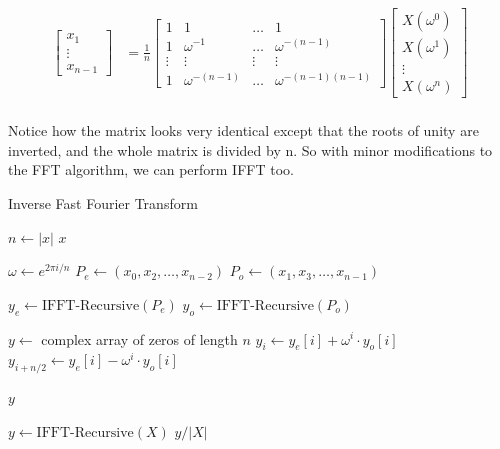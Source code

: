 \begin{align*}
\begin{bmatrix}
    x_1\\
    \vdots\\
    x_{n-1}
\end{bmatrix}
    &=
    \frac{1}{n}
\begin{bmatrix}
    1      & 1      & \dots  & 1\\
    1      & \omega^{-1} & \dots  & \omega^{-(n-1)}\\
    \vdots & \vdots & \vdots & \vdots\\
    1      & \omega^{-(n-1)} & \dots & \omega^{-(n-1)(n-1)}
\end{bmatrix}
\begin{bmatrix}
    X(\omega^0)\\
    X(\omega^1)\\
    \vdots\\
    X(\omega^n)
\end{bmatrix}\\
\end{align*}

Notice how the matrix looks very identical except that the roots of unity are inverted, and the whole matrix is divided by n. So with minor modifications to the FFT algorithm, we can perform IFFT too.

\begin{algorithm}
\caption{Inverse Fast Fourier Transform}
\begin{algorithmic}[1]
    \State $n \gets |x|$ 
        \State \Return $x$
    \EndIf
    
    \State $\omega \gets e^{2\pi i / n}$ 
    \State $P_e \gets (x_0, x_2, \ldots, x_{n-2})$ 
    \State $P_o \gets (x_1, x_3, \ldots, x_{n-1})$ 
    
    \State $y_e \gets \text{IFFT-Recursive}(P_e)$ 
    \State $y_o \gets \text{IFFT-Recursive}(P_o)$ 
    
    \State $y \gets $ complex array of zeros of length $n$ 
        \State $y_i \gets y_e[i] + \omega^i \cdot y_o[i]$ 
        \State $y_{i+n/2} \gets y_e[i] - \omega^i \cdot y_o[i]$ 
    \EndFor
    
    \State \Return $y$
\EndProcedure

    \State $y \gets \text{IFFT-Recursive}(X)$
    \State \Return $y / |X|$ 
\EndProcedure
\end{algorithmic}
\end{algorithm}

